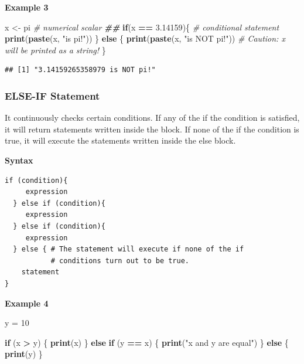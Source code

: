 \documentclass[
]{book}
\newenvironment{Shaded}{\begin{snugshade}}{\end{snugshade}}
\newcommand{\CommentTok}[1]{\textcolor[rgb]{0.56,0.35,0.01}{\textit{#1}}}
\newcommand{\ControlFlowTok}[1]{\textcolor[rgb]{0.13,0.29,0.53}{\textbf{#1}}}
\newcommand{\DecValTok}[1]{\textcolor[rgb]{0.00,0.00,0.81}{#1}}
\newcommand{\DocumentationTok}[1]{\textcolor[rgb]{0.56,0.35,0.01}{\textbf{\textit{#1}}}}
\newcommand{\FloatTok}[1]{\textcolor[rgb]{0.00,0.00,0.81}{#1}}
\newcommand{\FunctionTok}[1]{\textcolor[rgb]{0.13,0.29,0.53}{\textbf{#1}}}
\newcommand{\NormalTok}[1]{#1}
\newcommand{\OtherTok}[1]{\textcolor[rgb]{0.56,0.35,0.01}{#1}}
\newcommand{\SpecialCharTok}[1]{\textcolor[rgb]{0.81,0.36,0.00}{\textbf{#1}}}
\newcommand{\StringTok}[1]{\textcolor[rgb]{0.31,0.60,0.02}{#1}}
\begin{document}
\textbf{Example 3}

\begin{Shaded}
\begin{Highlighting}[]
\NormalTok{x }\OtherTok{\textless{}{-}}\NormalTok{ pi                       }\CommentTok{\# numerical scalar}
\DocumentationTok{\#\#  }
\ControlFlowTok{if}\NormalTok{(x }\SpecialCharTok{==} \FloatTok{3.14159}\NormalTok{)\{             }\CommentTok{\# conditional statement}
   \FunctionTok{print}\NormalTok{(}\FunctionTok{paste}\NormalTok{(x, }\StringTok{"is pi!"}\NormalTok{))  }
\NormalTok{   \} }\ControlFlowTok{else}\NormalTok{ \{}
   \FunctionTok{print}\NormalTok{(}\FunctionTok{paste}\NormalTok{(x, }\StringTok{"is NOT pi!"}\NormalTok{))  }\CommentTok{\# Caution: x will be printed as a string!}
\NormalTok{  \}}
\end{Highlighting}
\end{Shaded}

\begin{verbatim}
## [1] "3.14159265358979 is NOT pi!"
\end{verbatim}

\hypertarget{else-if-statement}{%
\subsubsection{ELSE-IF Statement}\label{else-if-statement}}

It continuously checks certain conditions. If any of the if the condition is satisfied, it will return statements written inside the block. If none of the if the condition is true, it will execute the statements written inside the else block.

\textbf{Syntax}

\begin{verbatim}
if (condition){
     expression
  } else if (condition){
     expression
  } else if (condition){
     expression
  } else { # The statement will execute if none of the if 
           # conditions turn out to be true.
    statement 
}
\end{verbatim}

\textbf{Example 4}

\begin{Shaded}
\begin{Highlighting}[]
\NormalTok{y }\OtherTok{=} \DecValTok{10}

\ControlFlowTok{if}\NormalTok{ (x }\SpecialCharTok{\textgreater{}}\NormalTok{ y) \{                     }
    \FunctionTok{print}\NormalTok{(x)}
\NormalTok{\} }\ControlFlowTok{else} \ControlFlowTok{if}\NormalTok{ (y }\SpecialCharTok{==}\NormalTok{ x) \{}
    \FunctionTok{print}\NormalTok{(}\StringTok{"x and y are equal"}\NormalTok{)}
\NormalTok{\} }\ControlFlowTok{else}\NormalTok{ \{                         }
    \FunctionTok{print}\NormalTok{(y)}
\NormalTok{\}}
\end{Highlighting}
\end{Shaded}
\end{document}
